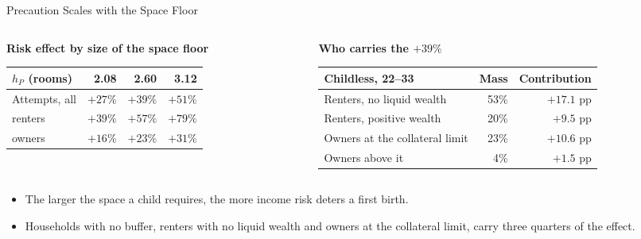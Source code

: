 \begin{frame}[t]{Precaution Scales with the Space Floor}
\linespread{1.0}\footnotesize\selectfont
\begin{columns}[T,onlytextwidth]
\begin{column}{0.47\textwidth}
\textbf{Risk effect by size of the space floor}
\smallskip

\scriptsize\setlength{\tabcolsep}{3pt}\renewcommand{\arraystretch}{1.05}
\begin{tabular}{@{}lrrr@{}}
\toprule
$h_P$ (rooms) & 2.08 & 2.60 & 3.12 \\
\midrule
Attempts, all & $+27\%$ & $+39\%$ & $+51\%$ \\
\quad renters & $+39\%$ & $+57\%$ & $+79\%$ \\
\quad owners & $+16\%$ & $+23\%$ & $+31\%$ \\
\bottomrule
\end{tabular}
\end{column}
\begin{column}{0.50\textwidth}
\textbf{Who carries the $+39\%$}
\smallskip

\scriptsize\setlength{\tabcolsep}{3pt}\renewcommand{\arraystretch}{1.05}
\begin{tabular}{@{}lrr@{}}
\toprule
Childless, 22--33 & Mass & Contribution \\
\midrule
Renters, no liquid wealth & 53\% & $+17.1$ pp \\
Renters, positive wealth & 20\% & $+9.5$ pp \\
Owners at the collateral limit & 23\% & $+10.6$ pp \\
Owners above it & 4\% & $+1.5$ pp \\
\bottomrule
\end{tabular}
\end{column}
\end{columns}
\smallskip

\footnotesize
\begin{itemize}\setlength\itemsep{1pt}\setlength\topsep{2pt}
\item The larger the space a child requires, the more income risk deters a first birth.
\item Households with no buffer, renters with no liquid wealth and owners at the collateral limit, carry three quarters of the effect.
\end{itemize}

\end{frame}

